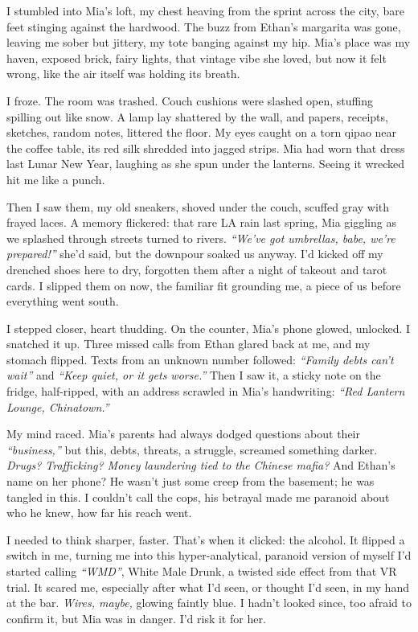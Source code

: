 \documentclass[12pt]{article}
\begin{document}
{I stumbled into \textnormal{Mia}’s loft, my chest heaving from the sprint across the city, bare feet stinging against the hardwood. The buzz from \textnormal{Ethan}’s margarita was gone, leaving me sober but jittery, my tote banging against my hip. \textnormal{Mia}’s place was my haven, exposed brick, fairy lights, that vintage vibe she loved, but now it felt wrong, like the air itself was holding its breath.

I froze. The room was trashed. Couch cushions were slashed open, stuffing spilling out like snow. A lamp lay shattered by the wall, and papers, receipts, sketches, random notes, littered the floor. My eyes caught on a torn qipao near the coffee table, its red silk shredded into jagged strips. \textnormal{Mia} had worn that dress last Lunar New Year, laughing as she spun under the lanterns. Seeing it wrecked hit me like a punch.

Then I saw them, my old sneakers, shoved under the couch, scuffed gray with frayed laces. A memory flickered: that rare LA rain last spring, \textnormal{Mia} giggling as we splashed through streets turned to rivers. \textit{“We’ve got umbrellas, babe, we’re prepared!”} she’d said, but the downpour soaked us anyway. I’d kicked off my drenched shoes here to dry, forgotten them after a night of takeout and tarot cards. I slipped them on now, the familiar fit grounding me, a piece of us before everything went south.

I stepped closer, heart thudding. On the counter, \textnormal{Mia}’s phone glowed, unlocked. I snatched it up. Three missed calls from \textnormal{Ethan} glared back at me, and my stomach flipped. Texts from an unknown number followed: \textit{“Family debts can’t wait”} and \textit{“Keep quiet, or it gets worse.”} Then I saw it, a sticky note on the fridge, half-ripped, with an address scrawled in \textnormal{Mia}’s handwriting: \textit{“Red Lantern Lounge, Chinatown.”}

My mind raced. \textnormal{Mia}’s parents had always dodged questions about their \textit{“business,”} but this, debts, threats, a struggle, screamed something darker. \textit{Drugs? Trafficking? Money laundering tied to the Chinese mafia?} And \textnormal{Ethan}’s name on her phone? He wasn’t just some creep from the basement; he was tangled in this. I couldn’t call the cops, his betrayal made me paranoid about who he knew, how far his reach went.

I needed to think sharper, faster. That’s when it clicked: the alcohol. It flipped a switch in me, turning me into this hyper-analytical, paranoid version of myself I’d started calling \textit{“WMD”}, White Male Drunk, a twisted side effect from that VR trial. It scared me, especially after what I’d seen, or thought I’d seen, in my hand at the bar. \textit{Wires, maybe,} glowing faintly blue. I hadn’t looked since, too afraid to confirm it, but \textnormal{Mia} was in danger. I’d risk it for her.

}
\end{document}
